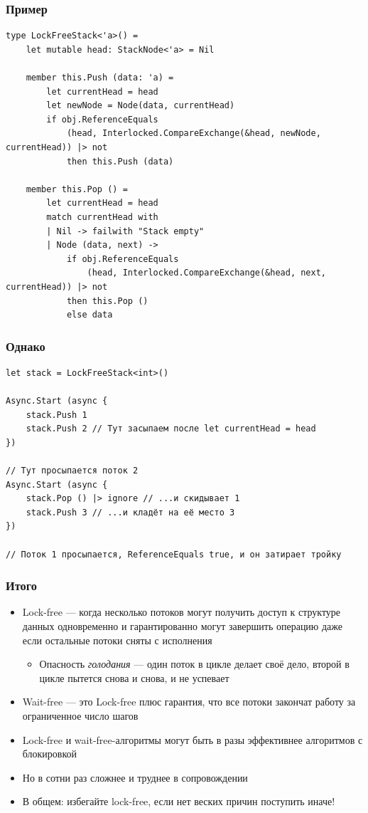 \documentclass[xetex,mathserif,serif]{beamer}
\begin{document}
    \begin{frame}[fragile]
        \frametitle{Пример}
        \begin{footnotesize}
            \begin{verbatim}
type LockFreeStack<'a>() =
    let mutable head: StackNode<'a> = Nil
    
    member this.Push (data: 'a) =
        let currentHead = head
        let newNode = Node(data, currentHead)
        if obj.ReferenceEquals
            (head, Interlocked.CompareExchange(&head, newNode, currentHead)) |> not 
            then this.Push (data)

    member this.Pop () =
        let currentHead = head
        match currentHead with
        | Nil -> failwith "Stack empty"
        | Node (data, next) ->
            if obj.ReferenceEquals
                (head, Interlocked.CompareExchange(&head, next, currentHead)) |> not 
            then this.Pop ()
            else data
            \end{verbatim}
        \end{footnotesize}
    \end{frame}

    \begin{frame}[fragile]
        \frametitle{Однако}
        \begin{verbatim}
let stack = LockFreeStack<int>()

Async.Start (async { 
    stack.Push 1
    stack.Push 2 // Тут засыпаем после let currentHead = head
})

// Тут просыпается поток 2
Async.Start (async { 
    stack.Pop () |> ignore // ...и скидывает 1
    stack.Push 3 // ...и кладёт на её место 3
})

// Поток 1 просыпается, ReferenceEquals true, и он затирает тройку
        \end{verbatim}
    \end{frame}

    \begin{frame}
        \frametitle{Итого}
        \begin{itemize}
            \item Lock-free --- когда несколько потоков могут получить доступ к структуре данных одновременно и гарантированно могут завершить операцию даже если остальные потоки сняты с исполнения
            \begin{itemize}
                \item Опасность \textit{голодания} --- один поток в цикле делает своё дело, второй в цикле пытется снова и снова, и не успевает
            \end{itemize}
            \item Wait-free --- это Lock-free плюс гарантия, что все потоки закончат работу за ограниченное число шагов
            \item Lock-free и wait-free-алгоритмы могут быть в разы эффективнее алгоритмов с блокировкой
            \item Но в сотни раз сложнее и труднее в сопровождении
            \item В общем: избегайте lock-free, если нет веских причин поступить иначе!
        \end{itemize}
    \end{frame}
\end{document}
